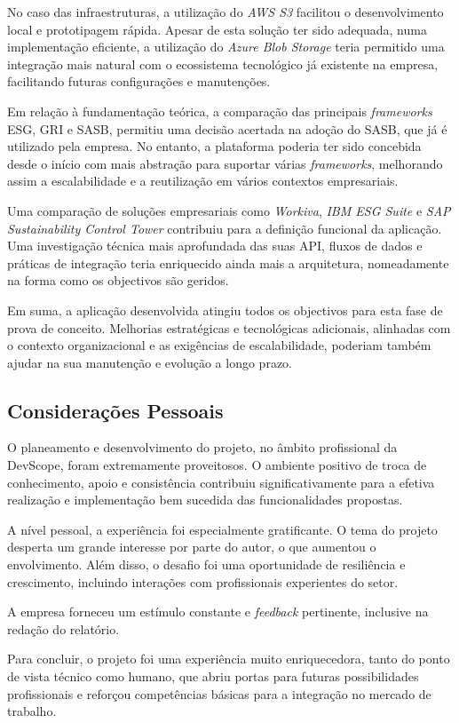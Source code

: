 No caso das infraestruturas, a utilização do \textit{AWS S3} facilitou o desenvolvimento local e prototipagem rápida. Apesar de esta solução ter sido adequada, numa implementação eficiente, a utilização do \textit{Azure Blob Storage} teria permitido uma integração mais natural com o ecossistema tecnológico já existente na empresa, facilitando futuras configurações e manutenções.

Em relação à fundamentação teórica, a comparação das principais \textit{frameworks} ESG, GRI e SASB, permitiu uma decisão acertada na adoção do SASB, que já é utilizado pela empresa. No entanto, a plataforma poderia ter sido concebida desde o início com mais abstração para suportar várias \textit{frameworks}, melhorando assim a escalabilidade e a reutilização em vários contextos empresariais.

Uma comparação de soluções empresariais como \textit{Workiva}, \textit{IBM ESG Suite} e \textit{SAP Sustainability Control Tower} contribuiu para a definição funcional da aplicação. Uma investigação técnica mais aprofundada das suas API, fluxos de dados e práticas de integração teria enriquecido ainda mais a arquitetura, nomeadamente na forma como os objectivos são geridos.

Em suma, a aplicação desenvolvida atingiu todos os objectivos para esta fase de prova de conceito. Melhorias estratégicas e tecnológicas adicionais, alinhadas com o contexto organizacional e as exigências de escalabilidade, poderiam também ajudar na sua manutenção e evolução a longo prazo.

\subsection{Considerações Pessoais}

O planeamento e desenvolvimento do projeto, no âmbito profissional da DevScope, foram extremamente proveitosos. O ambiente positivo de troca de conhecimento, apoio e consistência contribuiu significativamente para a efetiva realização e implementação bem sucedida das funcionalidades propostas.

A nível pessoal, a experiência foi especialmente gratificante. O tema do projeto desperta um grande interesse por parte do autor, o que aumentou o envolvimento. Além disso, o desafio foi uma oportunidade de resiliência e crescimento, incluindo interações com profissionais experientes do setor.

A empresa forneceu um estímulo constante e \textit{feedback} pertinente, inclusive na redação do relatório.

Para concluir, o projeto foi uma experiência muito enriquecedora, tanto do ponto de vista técnico como humano, que abriu portas para futuras possibilidades profissionais e reforçou competências básicas para a integração no mercado de trabalho.